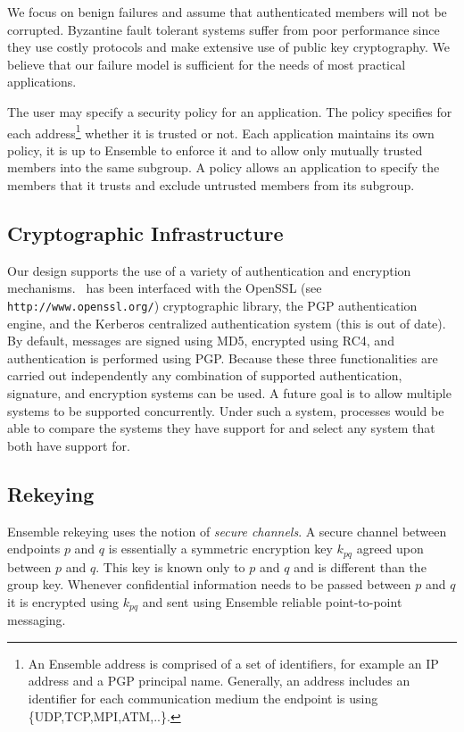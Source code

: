 We focus on benign failures and assume that authenticated members will
not be corrupted.  Byzantine fault tolerant systems suffer from
poor performance since they use costly protocols and make extensive use of
public key cryptography. We believe that our failure model is
sufficient for the needs of most practical applications.  

The user may specify a security policy for an application. The policy
specifies for each address\footnote{An Ensemble address is comprised
of a set of identifiers, for example an IP address and a PGP principal
name. Generally, an address includes an identifier for each
communication medium the endpoint is using \{UDP,TCP,MPI,ATM,..\}.}
whether it is trusted or not. Each application maintains its
own policy, it is up to Ensemble to enforce it and
to allow only mutually trusted members into the same subgroup. A policy
allows an application to specify the members that it trusts and
exclude untrusted members from its subgroup.

\subsection{Cryptographic Infrastructure}
Our design supports the use of a variety of authentication and
encryption mechanisms. \ensemble\ has been interfaced with the OpenSSL
(see {\tt http://www.openssl.org/}) cryptographic library, the PGP authentication engine, and the Kerberos
centralized authentication system (this is out of date). By default,
messages are signed using MD5, encrypted using RC4, and authentication
is performed using PGP. Because these three functionalities are
carried out independently any combination of supported authentication,
signature, and encryption systems can be used.  A future goal is to
allow multiple systems to be supported concurrently.  Under such a
system, processes would be able to compare the systems they have
support for and select any system that both have support for.

\subsection{Rekeying}
Ensemble rekeying uses the notion of {\it secure channels}. A secure
channel between endpoints $p$ and $q$ is essentially a symmetric
encryption key $k_{pq}$ agreed upon between $p$ and $q$. This key is
known only to $p$ and $q$ and is different than the group
key. Whenever confidential information needs to be passed between $p$
and $q$ it is encrypted using $k_{pq}$ and sent using Ensemble
reliable point-to-point messaging. 

